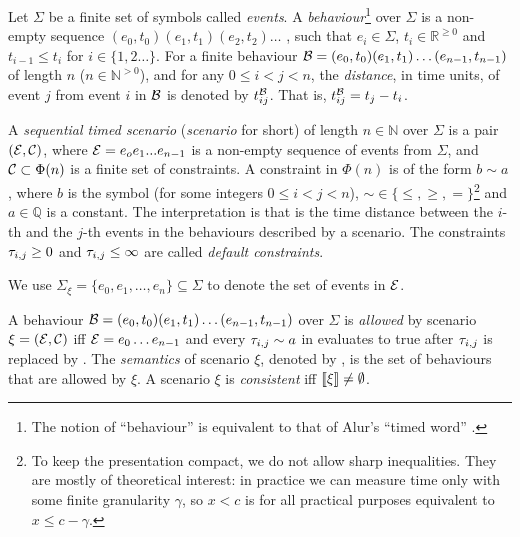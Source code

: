 Let $\Sigma$ be a finite set of symbols called \emph{events}.  A
\emph{behaviour}\footnote{The notion of ``behaviour'' is equivalent to
that of Alur's ``timed word'' \cite{alur94}.
}
over $\Sigma$ is a non-empty
  sequence $(e_0, t_0)(e_1, t_1)(e_2, t_2)\dots$ , such that
  $e_i \in \Sigma$, $t_i \in \mathbb{R}^{\geq
  0}$ and $t_{i-1}\leq t_i$ for $i \in \{1, 2 \dots\}$.
 For a finite behaviour $\mathcal{B} = (e_0,t_0) (e_1,t_1) \ldots
(e_{n-1},t_{n-1})$ of length $n$ ($n \in \mathbb{N}^{>0}$), and for any $0 \leq i < j < n$,
  the \emph{distance}, in time units, of
event $j$ from event $i$ in $\mathcal{B}$ is denoted by
$t_{ij}^{\mathcal{B}}$.  That is,
$t_{ij}^{\mathcal{B}} = t_j - t_i$.

A \emph{sequential timed scenario} (\emph{scenario} for short) of length
$n \in \mathbb{N}$ over $\Sigma$ is a pair $(\mathcal{E}, \mathcal{C})$,
where $\mathcal{E} = e_o e_1 ... e_{n-1}$ is a non-empty sequence of events
from $\Sigma$, and
$\mathcal{C} \subset \Phi(n)$ is a finite set of constraints.
A constraint in $\Phi(n)$ is
  of the form $b \sim a$, where  $b$ is the symbol  (for some
  integers
     $0 \leq i < j < n$), $\sim\in\{\leq,\geq,=\}$\footnote{To keep the presentation compact, we do not allow sharp
    inequalities.
    They are mostly of theoretical interest: in practice we can measure time only
    with some finite granularity $\gamma$, so $x < c$ is for all practical
    purposes equivalent to $x \leq c - \gamma$.}
    and $a\in\mathbb{Q}$ is a constant.
The interpretation is that  is the time distance
between the $i$-th and the $j$-th events in the behaviours described
by a scenario.
The constraints $\tau_{i,j} \geq 0$ and $\tau_{i,j} \leq \infty$
are called \emph{default constraints}.

We use $\Sigma_{\xi}= \{e_0, e_1, \dots, e_n \} \subseteq \Sigma$ to
denote the set of events in $\mathcal{E}$.

A behaviour $\mathcal{B} =
(e_0,t_0)(e_1,t_1)\ldots(e_{n-1},t_{n-1})$ over $\Sigma$
is \emph{allowed} by scenario $\xi = (\mathcal{E}, \mathcal{C})$ iff $ \mathcal{E} = e_0 \dots
e_{n-1}$ and every  $\tau_{i,j} \sim a$ in \C{} evaluates to true
after $\tau_{i,j}$ is replaced by .
The \emph{semantics} of scenario $\xi$, denoted by \Sem{\xi}, is the
set of behaviours that are allowed by $\xi$.
A scenario $\xi$ is \emph{consistent} iff $\llbracket \xi \rrbracket \neq \emptyset$.

